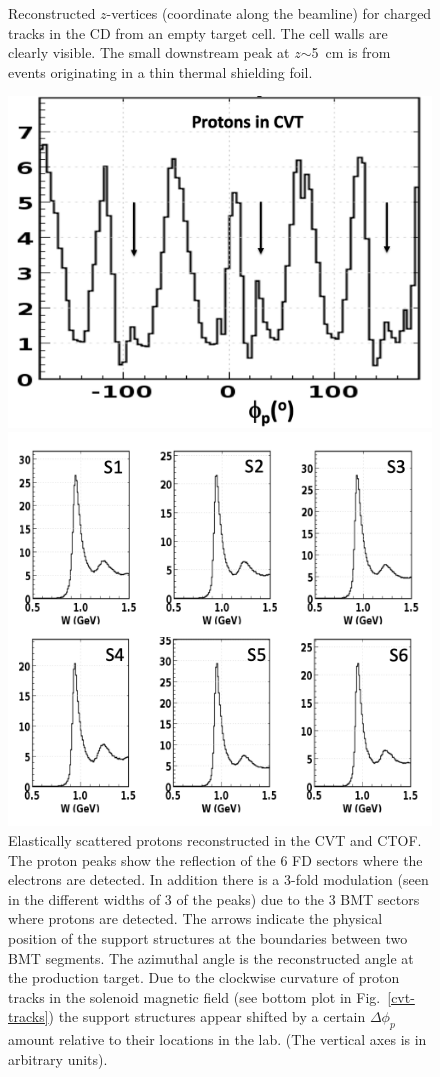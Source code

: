\documentclass[final,3p]{elsarticle}
\begin{document}
\begin{twocolumn}
\begin{figure}[t!]
\caption{Reconstructed $z$-vertices (coordinate along the beamline) for charged tracks in the CD from an empty target
  cell. The cell walls are clearly visible. The small downstream peak at $z$$\sim$5~cm is from events originating in a thin
  thermal shielding foil.}
\label{cvt-vertex}
\end{figure}
\begin{figure}[t!]
\centerline{\includegraphics[width=0.8\columnwidth]{CVT-elastic-protons.png}}
\caption{Elastically scattered protons reconstructed in the CVT and CTOF. The proton peaks show the reflection of
  the 6 FD sectors where the electrons are detected. In addition there is a 3-fold modulation (seen in the different
  widths of 3 of the peaks) due to the 3 BMT sectors where protons are detected. The arrows indicate the physical 
  position of the support structures at the boundaries between two BMT segments. The azimuthal angle is the
  reconstructed angle at the production target. Due to the clockwise curvature of proton tracks in the solenoid magnetic
  field (see bottom plot in Fig.~\ref{cvt-tracks}) the support structures appear shifted by a certain $\Delta{\phi_p}$
  amount relative to their locations in the lab. (The vertical axes is in arbitrary units).}
\label{CVT-elastic-protons}
\centerline{\includegraphics[width=0.9\columnwidth]{elastic-electrons.png}}

\end{figure}
\end{twocolumn}
\end{document}
